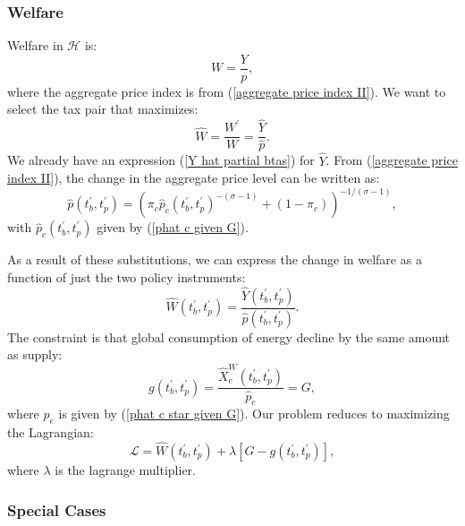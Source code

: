 \documentclass[notitlepage,12pt]{article}
\begin{document}
\subsubsection{Welfare}

Welfare in $\mathcal{H}$ is:%
\begin{equation*}
W=\frac{Y}{p},
\end{equation*}%
where the aggregate price index is from (\ref{aggregate price index II}). We
want to select the tax pair that maximizes:%
\begin{equation*}
\hat{W}=\frac{W^{\prime }}{W}=\frac{\hat{Y}}{\hat{p}}.
\end{equation*}%
We already have an expression (\ref{Y hat partial btas}) for $\hat{Y}$. From
(\ref{aggregate price index II}), the change in the aggregate price level
can be written as: 
\begin{equation}
\hat{p}(t_{b}^{\prime },t_{p}^{\prime })=\left( \pi _{c}\hat{p}%
_{c}(t_{b}^{\prime },t_{p}^{\prime })^{-\left( \sigma -1\right) }+(1-\pi
_{c})\right) ^{-1/(\sigma -1)},  \label{phat aggregate}
\end{equation}%
with $\hat{p}_{c}(t_{b}^{\prime },t_{p}^{\prime })$ given by (\ref{phat c
given G}).

As a result of these substitutions, we can express the change in welfare as
a function of just the two policy instruments:%
\begin{equation*}
\hat{W}(t_{b}^{\prime },t_{p}^{\prime })=\frac{\hat{Y}(t_{b}^{\prime
},t_{p}^{\prime })}{\hat{p}(t_{b}^{\prime },t_{p}^{\prime })}.
\end{equation*}%
The constraint is that global consumption of energy decline by the same
amount as supply:%
\begin{equation*}
g(t_{b}^{\prime },t_{p}^{\prime })=\frac{\hat{X}_{e}^{W}(t_{b}^{\prime
},t_{p}^{\prime })}{\hat{p}_{e}}=G,
\end{equation*}%
where $\hat{p}_{e}$ is given by (\ref{phat c star given G}). Our problem
reduces to maximizing the Lagrangian:%
\begin{equation*}
\mathcal{L}=\hat{W}(t_{b}^{\prime },t_{p}^{\prime })+\lambda \left[
G-g(t_{b}^{\prime },t_{p}^{\prime })\right] ,
\end{equation*}%
where $\lambda $ is the lagrange multiplier.

\subsubsection{Special Cases}
\end{document}
